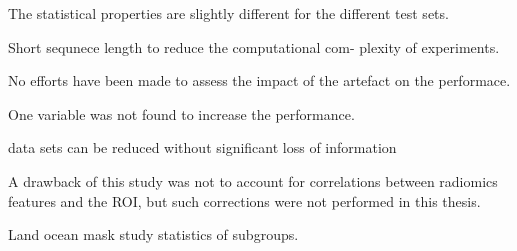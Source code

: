 The statistical properties are slightly different for the different test sets.  

Short sequnece length to reduce the computational com-
plexity of experiments. 

No efforts have been made to assess the impact of the artefact on the performace.

One variable was not found to increase the performance.


data sets can be reduced without significant loss of information

A drawback of this study was not to account for correlations between radiomics features and the ROI, but such corrections were
not performed in this thesis.

Land ocean mask study statistics of subgroups.


